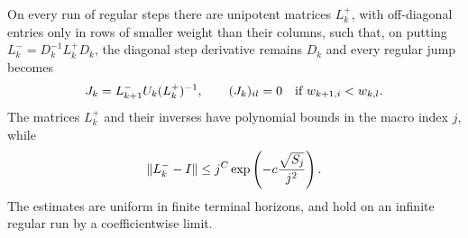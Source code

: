 \begin{lemma}\label{lem:linear-alignment}
On every run of regular steps there are unipotent matrices $L_k^+$,
with off-diagonal entries only in rows of smaller weight than their
columns, such that, on putting $L_k^-=D_k^{-1}L_k^+D_k$, the diagonal
step derivative remains $D_k$ and every regular jump becomes
\begin{equation}
 J_k=L_{k+1}^-U_k(L_k^+)^{-1},\qquad
 (J_k)_{il}=0\quad\hbox{if }w_{k+1,i}<w_{k,l}.
 \label{eq:dyn:aligned-jump}
\end{equation}
The matrices $L_k^+$ and their inverses have polynomial bounds in the
macro index $j$, while
\begin{equation}
 \lVert L_k^- -I\rVert
 \le j^C\exp\left(-c\frac{\sqrt{S_j}}{j^2}\right).
 \label{eq:dyn:small-start-change}
\end{equation}
The estimates are uniform in finite terminal horizons, and hold on an
infinite regular run by a coefficientwise limit.
\end{lemma}

